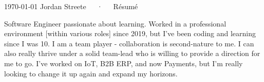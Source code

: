\documentclass[11pt, a4paper]{awesome-cv}
\begin{document}
\makecvheader

\makecvfooter
  {\today}
  {Jordan Streete~~~·~~~Résumé}
  {\thepage}



\begin{cvparagraph}
Software Engineer passionate about learning. Worked in a professional environment [within various roles] since 2019, but I've been coding and learning since I was 10. I am a team player - collaboration is second-nature to me. I can also really thrive under a solid team-lead who is willing to provide a direction for me to go. I've worked on IoT, B2B ERP, and now Payments, but I'm really looking to change it up again and expand my horizons.
\end{cvparagraph}

\end{document}
